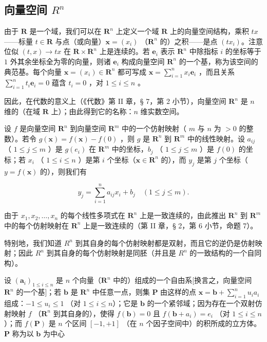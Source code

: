 \subsection{\texorpdfstring{向量空间 \(R^{n}\)}{向量空间 R 的 n 次幂}}

由于 \(\mathbf{R}\) 是一个域，我们可以在 \(\mathbf{R}^n\) 上定义一个域 \(\mathbf{R}\) 上的向量空间结构，乘积 \(tx\) ——标量 \(t \in \mathbf{R}\) 与点（或向量）\(\boldsymbol{x} = (x_i)\) （\(\mathbf{R}^n\) 的）之积——是点 \((tx_i)\)。注意位似 \((t, x) \to tx\) 在 \(\mathbf{R} \times \mathbf{R}^n\) 上是连续的。若 \(\boldsymbol{e}_i\) 表示 \(\mathbf{R}^n\) 中除指标 \(i\) 的坐标等于 \(1\) 外其余坐标全为零的向量，则诸 \(\boldsymbol{e}_i\) 构成向量空间 \(\mathbf{R}^n\) 的一个基，称为该空间的典范基。每个向量 \(\boldsymbol{x} = (x_i) \in \mathbf{R}^n\) 都可写成 \(\boldsymbol{x} = \sum_{i=1}^{n} x_i \boldsymbol{e}_i\) ，而且关系 \(\sum_{i=1}^{n} t_i \boldsymbol{e}_i = 0\) 蕴含 \(t_i = 0\) ，对 \(1 \leqslant i \leqslant n\) 。

因此，在代数的意义上（《代数》第 II 章，§ 7，第 2 小节），向量空间 \(\mathbf{R}^n\) 是 \(n\) 维的（在域 \(\mathbf{R}\) 上）；由此得到它的名称：\(n\) 维实数空间。

设 \(f\) 是向量空间 \(\mathbf{R}^n\) 到向量空间 \(\mathbf{R}^m\) 中的一个仿射映射（ \(m\) 与 \(n\) 为 \(>0\) 的整数）。若令 \(g(\boldsymbol{x}) = f(\boldsymbol{x}) - f(0)\) ，则 \(g\) 是 \(\mathbf{R}^n\) 到 \(\mathbf{R}^m\) 中的线性映射。设 \(a_{ij}\) （ \(1 \leqslant j \leqslant m\) ）是 \(g(e_i)\) 在 \(\mathbf{R}^m\) 中的坐标，\(b_j\) （ \(1 \leqslant j \leqslant m\) ）是 \(f(0)\) 的坐标；若 \(x_i\) （ \(1 \leqslant i \leqslant n\) ）是第 \(i\) 个坐标（\(\boldsymbol{x} \in \mathbf{R}^n\) 的），而 \(y_j\) 是第 \(j\) 个坐标（\(y = f(\boldsymbol{x})\) 的），则我们有

\[
y _ {j} = \sum_ {i = 1} ^ {n} a _ {i j} x _ {i} + b _ {j} \quad (1 \leqslant j \leqslant m).
\]

由于 \(x_1, x_2, \ldots, x_n\) 的每个线性多项式在 \(\mathbf{R}^n\) 上是一致连续的，由此推出 \(\mathbf{R}^n\) 到 \(\mathbf{R}^m\) 中的每个仿射映射在 \(\mathbf{R}^n\) 上是一致连续的（第 II 章，§ 2，第 6 小节，命题 7）。

特别地，我们知道 \(R^{n}\) 到其自身的每个仿射映射都是双射，而且它的逆仍是仿射映射；因此 \(R^{n}\) 到其自身的每个仿射映射是同胚（并且是 \(R^{n}\) 的一致结构的一个自同构）。

设 \((\pmb{a}_i)_{1\leqslant i\leqslant n}\) 是 \(n\) 个向量（\(\mathbf{R}^n\) 中的）组成的一个自由系{[}换言之，向量空间 \(\mathbf{R}^n\) 的一个基{]}；若 \(\pmb{b}\) 是 \(\mathbf{R}^n\) 中任意一点，则集 \(\mathbf{P}\) 由这样的点 \(\pmb{x} = \pmb{b} + \sum_{i=1}^{n} u_i a_i\) 组成：\(-1 \leqslant u_i \leqslant 1\) （对 \(1 \leqslant i \leqslant n\)）；它是 \(\pmb{b}\) 的一个紧邻域；因为存在一个双射仿射映射 \(f\) （\(\mathbf{R}^n\) 到其自身的），使得 \(f(\pmb{b}) = 0\) 且 \(f(\pmb{b} + a_i) = e_i\) （对 \(1 \leqslant i \leqslant n\)）；而 \(f(\mathbf{P})\) 是 \(n\) 个区间 \([-1, +1]\) （在 \(n\) 个因子空间中）的积所成的立方体。\(\mathbf{P}\) 称为以 \(\pmb{b}\) 为中心

